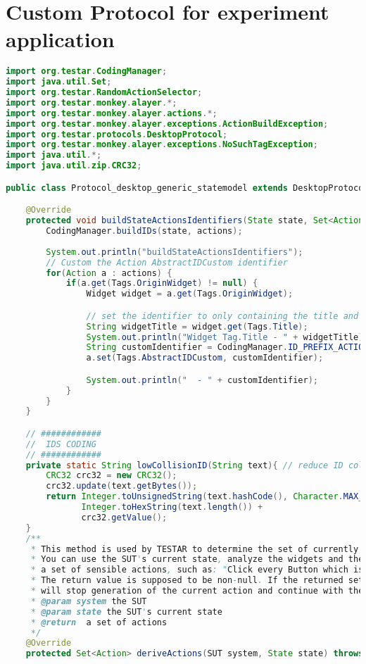 \chapter{Custom Protocol for experiment application} \label{appendix:protocol-experiment}

\begin{lstlisting}[language=java, caption=Protocol for the experiment application, label=code:protocol-experiment]
import org.testar.CodingManager;
import java.util.Set;
import org.testar.RandomActionSelector;
import org.testar.monkey.alayer.*;
import org.testar.monkey.alayer.actions.*;
import org.testar.monkey.alayer.exceptions.ActionBuildException;
import org.testar.protocols.DesktopProtocol;
import org.testar.monkey.alayer.exceptions.NoSuchTagException;
import java.util.*;
import java.util.zip.CRC32;

public class Protocol_desktop_generic_statemodel extends DesktopProtocol {

	@Override
	protected void buildStateActionsIdentifiers(State state, Set<Action> actions) {
		CodingManager.buildIDs(state, actions);
		
		System.out.println("buildStateActionsIdentifiers");
		// Custom the Action AbstractIDCustom identifier
		for(Action a : actions) {
			if(a.get(Tags.OriginWidget) != null) {
				Widget widget = a.get(Tags.OriginWidget);

				// set the identifier to only containing the title and not to include the parent
				String widgetTitle = widget.get(Tags.Title);
				System.out.println("Widget Tag.Title - " + widgetTitle);
				String customIdentifier = CodingManager.ID_PREFIX_ACTION + CodingManager.ID_PREFIX_ABSTRACT_CUSTOM + lowCollisionID(widgetTitle);
				a.set(Tags.AbstractIDCustom, customIdentifier);

				System.out.println("  - " + customIdentifier);
			}
		}
	}

	// ############
	//  IDS CODING
	// ############
	private static String lowCollisionID(String text){ // reduce ID collision probability
		CRC32 crc32 = new CRC32();
		crc32.update(text.getBytes());
		return Integer.toUnsignedString(text.hashCode(), Character.MAX_RADIX) +
			   Integer.toHexString(text.length()) +
			   crc32.getValue();
	}
	/**
	 * This method is used by TESTAR to determine the set of currently available actions.
	 * You can use the SUT's current state, analyze the widgets and their properties to create
	 * a set of sensible actions, such as: "Click every Button which is enabled" etc.
	 * The return value is supposed to be non-null. If the returned set is empty, TESTAR
	 * will stop generation of the current action and continue with the next one.
	 * @param system the SUT
	 * @param state the SUT's current state
	 * @return  a set of actions
	 */
	@Override
	protected Set<Action> deriveActions(SUT system, State state) throws ActionBuildException{


\end{lstlisting}
